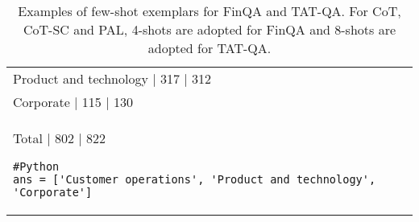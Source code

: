 \begin{table}[htbp]
\begin{tabular}{p{}}
Product and technology | 317 | 312 \\
Corporate | 115 | 130 \\
Total | 802 | 822 
\begin{verbatim}
#Python
ans = ['Customer operations', 'Product and technology', 'Corporate']
\end{verbatim}
\\
        \bottomrule
    \end{tabular}
     \caption{Examples of few-shot exemplars for FinQA and TAT-QA. For CoT, CoT-SC and PAL,
     4-shots are adopted for FinQA and 8-shots are adopted for TAT-QA.}
    \label{tab:exp-tables}
\end{table}

